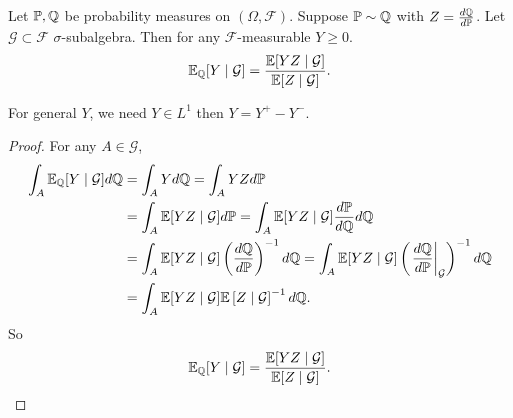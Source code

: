\begin{prop}
    Let $\mathbb{P},\mathbb{Q}$ be probability measures on $(\Omega,\mathcal{F})$. Suppose $\mathbb{P} \sim \mathbb{Q}$ with $Z = \frac{d\mathbb{Q}}{d\mathbb{P}}$. Let $\mathcal{G} \subset \mathcal{F}$ $\sigma$-subalgebra. Then for any $\mathcal{F}$-measurable $Y \geq 0$.
    \begin{equation*}
        \mathbb{E}_{\mathbb{Q}} [Y \mid \mathcal{G}] = \frac{\mathbb{E}[YZ \mid \mathcal{G}]}{\mathbb{E}[Z \mid \mathcal{G}]}.
    \end{equation*}
\end{prop}
\begin{rmk}
    For general $Y$, we need $Y \in L^1$ then $Y = Y^+ - Y^-$.
\end{rmk}
\begin{proof}
    For any $A \in \mathcal{G}$,
    \begin{align*}
        \int_A \mathbb{E}_{\mathbb{Q}} [Y \mid \mathcal{G}] d\mathbb{Q} &= \int_A Y d\mathbb{Q} = \int_A YZ d\mathbb{P} \\
        &= \int_A \mathbb{E}[YZ \mid \mathcal{G}] d\mathbb{P} = \int_A \mathbb{E}[YZ \mid \mathcal{G}] \frac{d\mathbb{P}}{d\mathbb{Q}} d\mathbb{Q}\\
        &= \int_A \mathbb{E}[YZ \mid \mathcal{G}] \left(\frac{d\mathbb{Q}}{d\mathbb{P}}\right)^{-1} d\mathbb{Q} = \int_A \mathbb{E}[YZ \mid \mathcal{G}] \left(\left.\frac{d\mathbb{Q}}{d\mathbb{P}}\right\lvert_{\mathcal{G}}\right)^{-1} d\mathbb{Q}\\
        &= \int_A \mathbb{E}[YZ \mid \mathcal{G}]\mathbb{E}\left[Z \mid \mathcal{G}\right]^{-1} d\mathbb{Q}.
    \end{align*}
    So
    \begin{equation*}
        \mathbb{E}_{\mathbb{Q}} [Y \mid \mathcal{G}] = \frac{\mathbb{E}[YZ \mid \mathcal{G}]}{\mathbb{E}[Z \mid \mathcal{G}]}. \qedhere
    \end{equation*}
\end{proof}
